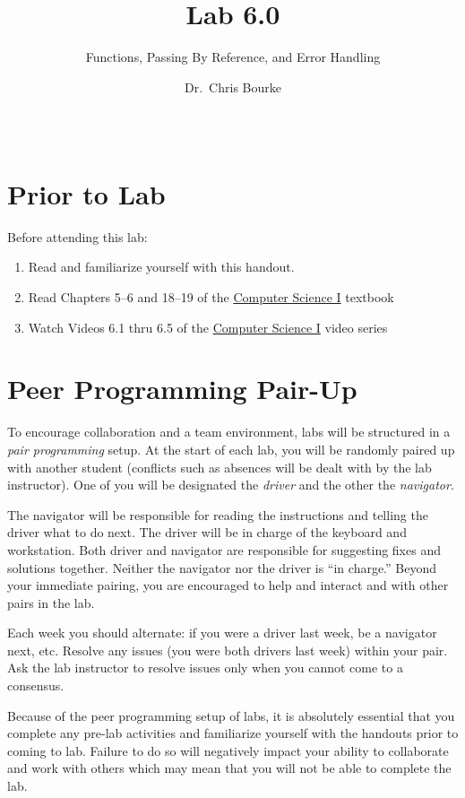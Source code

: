 \documentclass[12pt]{scrartcl}
\title{Lab 6.0}
\subtitle{Functions, Passing By Reference, and Error Handling}
\author{Dr.\ Chris Bourke}
\date{~}
\begin{document}
\maketitle

\section*{Prior to Lab}

Before attending this lab:
\begin{enumerate}
  \item Read and familiarize yourself with this handout.
  \item Read Chapters 5--6 and 18--19 of the \href{http://cse.unl.edu/~cbourke/ComputerScienceOne.pdf}{Computer Science I} textbook
  \item Watch Videos 6.1 thru 6.5 of the \href{https://www.youtube.com/playlist?list=PL4IH6CVPpTZVkiEnCEOdGbYsFEdtKc5Bx}{Computer Science I} video series
\end{enumerate}

\section*{Peer Programming Pair-Up}

To encourage collaboration and a team environment, labs will be
structured in a \emph{pair programming} setup.  At the start of
each lab, you will be randomly paired up with another student 
(conflicts such as absences will be dealt with by the lab instructor).
One of you will be designated the \emph{driver} and the other
the \emph{navigator}.  

The navigator will be responsible for reading the instructions and
telling the driver what to do next.  The driver will be in charge of the
keyboard and workstation.  Both driver and navigator are responsible
for suggesting fixes and solutions together.  Neither the navigator
nor the driver is ``in charge.''  Beyond your immediate pairing, you
are encouraged to help and interact and with other pairs in the lab.

Each week you should alternate: if you were a driver last week, 
be a navigator next, etc.  Resolve any issues (you were both drivers
last week) within your pair.  Ask the lab instructor to resolve issues
only when you cannot come to a consensus.  

Because of the peer programming setup of labs, it is absolutely 
essential that you complete any pre-lab activities and familiarize
yourself with the handouts prior to coming to lab.  Failure to do
so will negatively impact your ability to collaborate and work with 
others which may mean that you will not be able to complete the
lab.  
\end{document}
